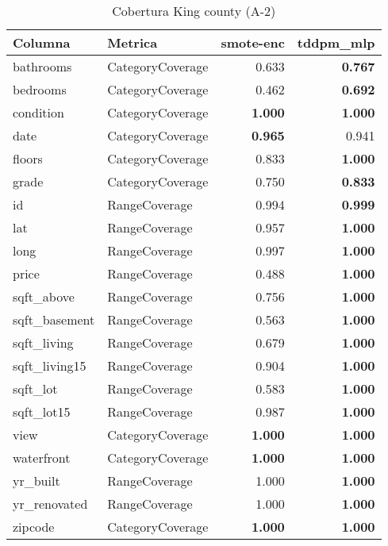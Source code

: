 \begin{table}[H]
\centering
\caption{Cobertura King county (A-2)}
\label{table-coverage-king county-a-2}
\begin{tabular}{|l|l|r|r|}
\hline
\rowcolor[gray]{0.8}
Columna & Metrica & smote-enc & tddpm\_mlp \\
\hline bathrooms & CategoryCoverage & 0.633 & \bfseries 0.767 \\
\hline bedrooms & CategoryCoverage & 0.462 & \bfseries 0.692 \\
\hline condition & CategoryCoverage & \bfseries 1.000 & \bfseries 1.000 \\
\hline date & CategoryCoverage & \bfseries 0.965 & 0.941 \\
\hline floors & CategoryCoverage & 0.833 & \bfseries 1.000 \\
\hline grade & CategoryCoverage & 0.750 & \bfseries 0.833 \\
\hline id & RangeCoverage & 0.994 & \bfseries 0.999 \\
\hline lat & RangeCoverage & 0.957 & \bfseries 1.000 \\
\hline long & RangeCoverage & 0.997 & \bfseries 1.000 \\
\hline price & RangeCoverage & 0.488 & \bfseries 1.000 \\
\hline sqft\_above & RangeCoverage & 0.756 & \bfseries 1.000 \\
\hline sqft\_basement & RangeCoverage & 0.563 & \bfseries 1.000 \\
\hline sqft\_living & RangeCoverage & 0.679 & \bfseries 1.000 \\
\hline sqft\_living15 & RangeCoverage & 0.904 & \bfseries 1.000 \\
\hline sqft\_lot & RangeCoverage & 0.583 & \bfseries 1.000 \\
\hline sqft\_lot15 & RangeCoverage & 0.987 & \bfseries 1.000 \\
\hline view & CategoryCoverage & \bfseries 1.000 & \bfseries 1.000 \\
\hline waterfront & CategoryCoverage & \bfseries 1.000 & \bfseries 1.000 \\
\hline yr\_built & RangeCoverage & 1.000 & \bfseries 1.000 \\
\hline yr\_renovated & RangeCoverage & 1.000 & \bfseries 1.000 \\
\hline zipcode & CategoryCoverage & \bfseries 1.000 & \bfseries 1.000 \\
\hline
\end{tabular}
\end{table}
